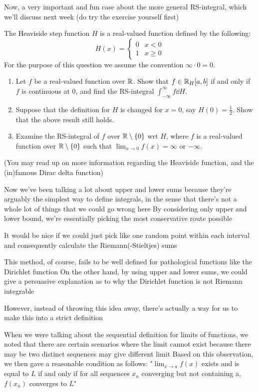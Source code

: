 Now, a very important and fun case about the more general RS-integral, which we'll discuss next week (do try the exercise yourself first)

\begin{exercise}
The Heaviside step function $H$ is a real-valued function defined by the following:
\[ H(x)=\begin{cases}
0 & x<0 \\
1 & x\ge0
\end{cases} \]
For the purpose of this question we assume the convention $\infty\cdot0=0$.
\begin{enumerate}[label=(\alph*)]
\item Let $f$ be a real-valued function over $\mathbb R$. Show that $f\in\mathbb R_H [a,b]$ if and only if $f$ is continuous at $0$, and find the RS-integral $\int_{-\infty}^\infty f\dd{H}$.
\item Suppose that the definition for $H$ is changed for $x=0$, say $H(0)=\frac{1}{2}$. Show that the above result still holds.
\item Examine the RS-integral of $f$ over $\mathbb R\setminus\{0\}$ wrt $H$, where $f$ is a real-valued function over $\mathbb R\setminus\{0\}$ such that $\lim_{x\to0}f(x)=\infty$ or $-\infty$.
\end{enumerate}
(You may read up on more information regarding the Heaviside function, and the (in)famous Dirac delta function)
\end{exercise}




Now we've been talking a lot about upper and lower sums because they're arguably the simplest way to define integrals, in the sense that there's not a whole lot of things that we could go wrong here
By considering only upper and lower bound, we're essentially picking the most conservative route possible

It would be nice if we could just pick like one random point within each interval and consequently calculate the Riemann(-Stieltjes) sums

This method, of course, fails to be well defined for pathological functions like the Dirichlet function
On the other hand, by using upper and lower sums, we could give a persuasive explanation as to why the Dirichlet function is not Riemann integrable

However, instead of throwing this idea away, there's actually a way for us to make this into a strict definition

When we were talking about the sequential definition for limits of functions, we noted that there are certain scenarios where the limit cannot exist because there may be two distinct sequences may give different limit
Based on this observation, we then gave a reasonable condition as follows:
"$\lim_{x\to a} f(x)$ exists and is equal to $L$ if and only if for all sequences $x_n$ converging but not containing a, $f(x_n)$ converges to $L$"

